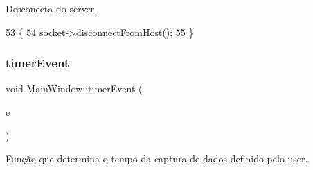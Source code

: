 Desconecta do server. 


\begin{DoxyCode}
53                               \{
54     socket->disconnectFromHost();
55 \}
\end{DoxyCode}
\mbox{\label{class_main_window_a9d08a694a5f9c532225754381b8011ea}} 
\subsubsection{\texorpdfstring{timer\+Event}{timerEvent}}
{\footnotesize\ttfamily void Main\+Window\+::timer\+Event (\begin{DoxyParamCaption}\item[{Q\+Timer\+Event $\ast$}]{e }\end{DoxyParamCaption})\hspace{0.3cm}{\ttfamily [slot]}}



Função que determina o tempo da captura de dados definido pelo user. 


